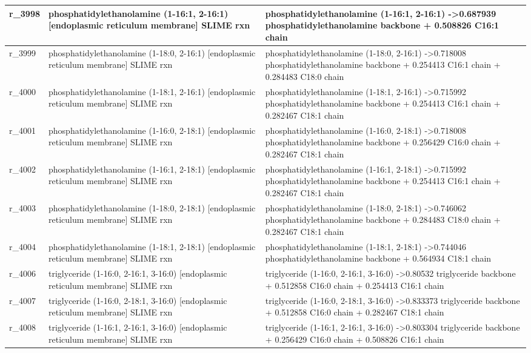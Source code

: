 \begin{landscape}
{\begin{longtable}{|l|p{7cm}|p{15cm}|}
r\_3998 & phosphatidylethanolamine (1-16:1, 2-16:1) {[}endoplasmic reticulum membrane{]} SLIME rxn & phosphatidylethanolamine (1-16:1, 2-16:1)  -\textgreater 0.687939 phosphatidylethanolamine backbone + 0.508826 C16:1 chain \\ \hline
r\_3999 & phosphatidylethanolamine (1-18:0, 2-16:1) {[}endoplasmic reticulum membrane{]} SLIME rxn & phosphatidylethanolamine (1-18:0, 2-16:1)  -\textgreater 0.718008 phosphatidylethanolamine backbone + 0.254413 C16:1 chain + 0.284483 C18:0 chain \\ \hline
r\_4000 & phosphatidylethanolamine (1-18:1, 2-16:1) {[}endoplasmic reticulum membrane{]} SLIME rxn & phosphatidylethanolamine (1-18:1, 2-16:1)  -\textgreater 0.715992 phosphatidylethanolamine backbone + 0.254413 C16:1 chain + 0.282467 C18:1 chain \\ \hline
r\_4001 & phosphatidylethanolamine (1-16:0, 2-18:1) {[}endoplasmic reticulum membrane{]} SLIME rxn & phosphatidylethanolamine (1-16:0, 2-18:1)  -\textgreater 0.718008 phosphatidylethanolamine backbone + 0.256429 C16:0 chain + 0.282467 C18:1 chain \\ \hline
r\_4002 & phosphatidylethanolamine (1-16:1, 2-18:1) {[}endoplasmic reticulum membrane{]} SLIME rxn & phosphatidylethanolamine (1-16:1, 2-18:1)  -\textgreater 0.715992 phosphatidylethanolamine backbone + 0.254413 C16:1 chain + 0.282467 C18:1 chain \\ \hline
r\_4003 & phosphatidylethanolamine (1-18:0, 2-18:1) {[}endoplasmic reticulum membrane{]} SLIME rxn & phosphatidylethanolamine (1-18:0, 2-18:1)  -\textgreater 0.746062 phosphatidylethanolamine backbone + 0.284483 C18:0 chain + 0.282467 C18:1 chain \\ \hline
r\_4004 & phosphatidylethanolamine (1-18:1, 2-18:1) {[}endoplasmic reticulum membrane{]} SLIME rxn & phosphatidylethanolamine (1-18:1, 2-18:1)  -\textgreater 0.744046 phosphatidylethanolamine backbone + 0.564934 C18:1 chain \\ \hline
r\_4006 & triglyceride (1-16:0, 2-16:1, 3-16:0) {[}endoplasmic reticulum membrane{]} SLIME rxn & triglyceride (1-16:0, 2-16:1, 3-16:0)  -\textgreater 0.80532 triglyceride backbone + 0.512858 C16:0 chain + 0.254413 C16:1 chain \\ \hline
r\_4007 & triglyceride (1-16:0, 2-18:1, 3-16:0) {[}endoplasmic reticulum membrane{]} SLIME rxn & triglyceride (1-16:0, 2-18:1, 3-16:0)  -\textgreater 0.833373 triglyceride backbone + 0.512858 C16:0 chain + 0.282467 C18:1 chain \\ \hline
r\_4008 & triglyceride (1-16:1, 2-16:1, 3-16:0) {[}endoplasmic reticulum membrane{]} SLIME rxn & triglyceride (1-16:1, 2-16:1, 3-16:0)  -\textgreater 0.803304 triglyceride backbone + 0.256429 C16:0 chain + 0.508826 C16:1 chain \\ \hline

\end{longtable}}
\end{landscape}
